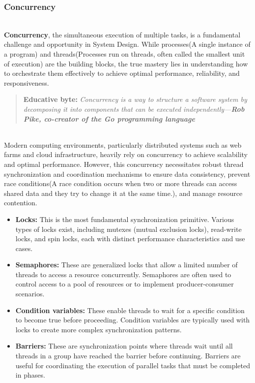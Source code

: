 \subsubsection{Concurrency}\label{JxdZ1z8OidoctYsJ0gveh}
\\
\textbf{Concurrency}, the simultaneous execution of multiple tasks, is a fundamental challenge and opportunity in System Design. While processes(A single instance of a program) and threads(Processes run on threads, often called the smallest unit of execution) are the building blocks, the true mastery lies in understanding how to orchestrate them effectively to achieve optimal performance, reliability, and responsiveness.
\begin{quote}
\textbf{Educative byte:} \emph{Concurrency is a way to structure a software system by decomposing it into components that can be executed independently---\textbf{Rob Pike, co-creator of the Go programming language}}
\end{quote}
\\
Modern computing environments, particularly distributed systems such as web farms and cloud infrastructure, heavily rely on concurrency to achieve scalability and optimal performance. However, this concurrency necessitates robust thread synchronization and coordination mechanisms to ensure data consistency, prevent race conditions(A race condition occurs when two or more threads can access shared data and they try to change it at the same time.), and manage resource contention.

\begin{itemize}
\item
\protect{}\label{z6iUI0mCRRrtkmT-ucgUM}
\textbf{Locks:} This is the most fundamental synchronization primitive. Various types of locks exist, including mutexes (mutual exclusion locks), read-write locks, and spin locks, each with distinct performance characteristics and use cases.
\item
\protect{}\label{SssVwsokEk_D9FQaZkjol}
\textbf{Semaphores:} These are generalized locks that allow a limited number of threads to access a resource concurrently. Semaphores are often used to control access to a pool of resources or to implement producer-consumer scenarios.
\item
\protect{}\label{k1Wbq75uSvLBDjVHGUz1G}
\textbf{Condition variables:} These enable threads to wait for a specific condition to become true before proceeding. Condition variables are typically used with locks to create more complex synchronization patterns.
\item
\protect{}\label{JUYTg2uxQ5hIyNQsbmcOH}
\textbf{Barriers:} These are synchronization points where threads wait until all threads in a group have reached the barrier before continuing. Barriers are useful for coordinating the execution of parallel tasks that must be completed in phases.
\end{itemize}

